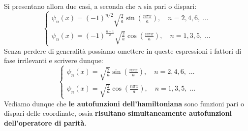 Si presentano allora due casi, a seconda che \emph{n} sia pari o dispari:
\begin{equation}
  \begin{cases}
    \psi_n(x)= (-1)^{n/2}\sqrt{\frac{2}{a}}\sin(\frac{n\pi x}{a}),\quad n=2,4,6,\;\dots\\
    \psi_n(x)= (-1)^{\frac{n+1}{2}}\sqrt{\frac{2}{a}}\cos(\frac{n\pi x}{a}),\quad n=1,3,5,\;\dots
  \end{cases}
\end{equation}
Senza perdere di generalità possiamo omettere in queste espressioni i fattori di fase irrilevanti e scrivere dunque:
\begin{equation}
  \begin{cases}
    \psi_n(x)= \sqrt{\frac{2}{a}}\sin(\frac{n\pi x}{a}),\quad n=2,4,6,\;\dots\\
    \psi_n(x)= \sqrt{\frac{2}{a}}\cos(\frac{n\pi x}{a}),\quad n=1,3,5,\;\dots
  \end{cases}
\end{equation}
Vediamo dunque che \textbf{le autofunzioni dell'hamiltoniana} sono funzioni pari o dispari delle coordinate, ossia \textbf{risultano simultaneamente autofunzioni dell'operatore di parità}.
